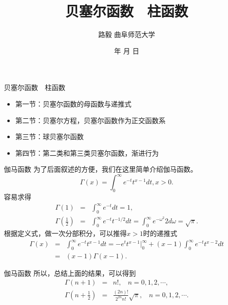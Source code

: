 \documentclass[11pt]{beamer}
\begin{document}
	\author{ 路毅 \hspace{0.3cm} 曲阜师范大学 }
	\date{\number\year 年 \number\month 月 \number\day 日}
	\title{贝塞尔函数　柱函数}

\begin{frame}
	\maketitle
\end{frame}

\kaishu

\begin{frame}{贝塞尔函数　柱函数}
\begin{itemize}
	\item {\color{blue}第一节：贝塞尔函数的母函数与递推式}
	\vspace{1cm}
	\item 第二节：贝塞尔方程，贝塞尔函数作为正交函数系
	\vspace{1cm}
	\item 第三节：球贝塞尔函数
	\vspace{1cm}
	\item 第四节：第二类和第三类贝塞尔函数，渐进行为
\end{itemize}
\end{frame}

\begin{frame}{伽马函数}
为了后面叙述的方便，我们在这里简单介绍伽马函数。
\begin{equation}
\Gamma(x) = \int^\infty_0 e^{-t} t^{x-1} dt, x>0.
\end{equation}
容易求得
\begin{eqnarray}
\Gamma(1) &=& \int^\infty_0 e^{-t} dt = 1, \\
\Gamma(\frac{1}{2}) &=& \int^\infty_0 e^{-t} t^{-1/2} dt
= \int^\infty_0 e^{-\omega^2} 2 d \omega = \sqrt{\pi}.
\end{eqnarray}
根据定义式，做一次分部积分，可以推得$x>1$时的递推式
\begin{eqnarray}
\Gamma(x) &=& \int^\infty_0 e^{-t}t^{x-1} dt 
= - e^t t^{x-1} |^\infty_0 + (x-1)\int^\infty_0 e^{-t} t^{x-2} dt \nonumber\\
&=& (x-1) \Gamma(x-1).
\end{eqnarray}

\end{frame}

\begin{frame}{伽马函数}
所以，总结上面的结果，可以得到
\begin{eqnarray}
\Gamma(n+1) &=& n!, ~~~~ n = 0,1,2,\cdots, \\
\Gamma(n+\frac{1}{2}) &=& \frac{(2n)!}{2^{2n} n!} \sqrt{\pi}, ~~~~ n = 0,1,2,\cdots.
\end{eqnarray}
\end{frame}
\end{document}
